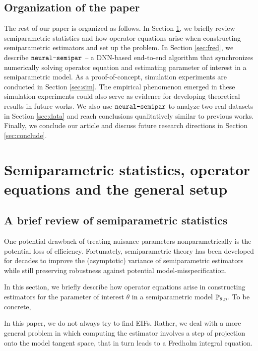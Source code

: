 \documentclass[11pt]{article}
\def\neurosemi{{\normalfont\texttt{neural-semipar}}}
\newcounter{todocounter}
\newcommand{\lin}[1]{\stepcounter{todocounter}{\color{red!90} Lin: \thetodocounter: #1}}
\begin{document}
\subsection*{Organization of the paper}
The rest of our paper is organized as follows. In Section \ref{sec:setup}, we briefly review semiparametric statistics and how operator equations arise when constructing semiparametric estimators and set up the problem. In Section \ref{sec:fred}, we describe $\neurosemi$ -- a DNN-based end-to-end algorithm that synchronizes numerically solving operator equation and estimating parameter of interest in a semiparametric model. As a proof-of-concept, simulation experiments are conducted in Section \ref{sec:sim}. The empirical phenomenon emerged in these simulation experiments could also serve as evidence for developing theoretical results in future works. We also use $\neurosemi$ to analyze two real datasets in Section \ref{sec:data} and reach conclusions qualitatively similar to previous works. Finally, we conclude our article and discuss future research directions in Section \ref{sec:conclude}.

\lin{i stop here.}

\section{Semiparametric statistics, operator equations and the general setup}
\label{sec:setup}

\subsection{A brief review of semiparametric statistics}
\label{sec:semi-review}

One potential drawback of treating nuisance parameters nonparametrically is the potential loss of efficiency. Fortunately, semiparametric theory has been developed for decades to improve the (asymptotic) variance of semiparametric estimators \citep{bickel1998efficient, tsiatis2007semiparametric} while still preserving robustness against potential model-misspecification.

In this section, we briefly describe how operator equations arise in constructing estimators for the parameter of interest $\theta$ in a semiparametric model ${\mathbb{P}}_{\theta, \eta}$. To be concrete, 

In this paper, we do not always try to find EIFs. Rather, we deal with a more general problem in which computing the estimator involves a step of projection onto the model tangent space, that in turn leads to a Fredholm integral equation.
\end{document}
